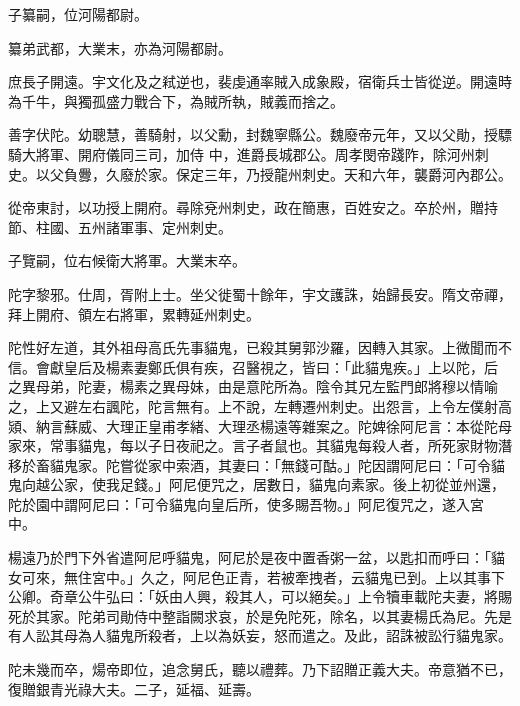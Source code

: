 \begin{pinyinscope}
 子纂嗣，位河陽都尉。



 纂弟武都，大業末，亦為河陽都尉。



 庶長子開遠。宇文化及之弒逆也，裴虔通率賊入成象殿，宿衛兵士皆從逆。開遠時為千牛，與獨孤盛力戰合下，為賊所執，賊義而捨之。



 善字伏陀。幼聰慧，善騎射，以父勳，封魏寧縣公。魏廢帝元年，又以父勛，授驃騎大將軍、開府儀同三司，加侍
 中，進爵長城郡公。周孝閔帝踐阼，除河州刺史。以父負釁，久廢於家。保定三年，乃授龍州刺史。天和六年，襲爵河內郡公。



 從帝東討，以功授上開府。尋除兗州刺史，政在簡惠，百姓安之。卒於州，贈持節、柱國、五州諸軍事、定州刺史。



 子覽嗣，位右候衛大將軍。大業末卒。



 陀字黎邪。仕周，胥附上士。坐父徙蜀十餘年，宇文護誅，始歸長安。隋文帝禪，拜上開府、領左右將軍，累轉延州刺史。



 陀性好左道，其外祖母高氏先事貓鬼，已殺其舅郭沙羅，因轉入其家。上微聞而不信。會獻皇后及楊素妻鄭氏俱有疾，召醫視之，皆曰：「此貓鬼疾。」上以陀，后
 之異母弟，陀妻，楊素之異母妹，由是意陀所為。陰令其兄左監門郎將穆以情喻之，上又避左右諷陀，陀言無有。上不說，左轉遷州刺史。出怨言，上令左僕射高熲、納言蘇威、大理正皇甫孝緒、大理丞楊遠等雜案之。陀婢徐阿尼言：本從陀母家來，常事貓鬼，每以子日夜祀之。言子者鼠也。其貓鬼每殺人者，所死家財物潛移於畜貓鬼家。陀嘗從家中索酒，其妻曰：「無錢可酤。」陀因謂阿尼曰：「可令貓鬼向越公家，使我足錢。」阿尼便咒之，居數日，貓鬼向素家。後上初從並州還，陀於園中謂阿尼曰：「可令貓鬼向皇后所，使多賜吾物。」阿尼復咒之，遂入宮
 中。



 楊遠乃於門下外省遣阿尼呼貓鬼，阿尼於是夜中置香粥一盆，以匙扣而呼曰：「貓女可來，無住宮中。」久之，阿尼色正青，若被牽拽者，云貓鬼已到。上以其事下公卿。奇章公牛弘曰：「妖由人興，殺其人，可以絕矣。」上令犢車載陀夫妻，將賜死於其家。陀弟司勛侍中整詣闕求哀，於是免陀死，除名，以其妻楊氏為尼。先是有人訟其母為人貓鬼所殺者，上以為妖妄，怒而遣之。及此，詔誅被訟行貓鬼家。



 陀未幾而卒，煬帝即位，追念舅氏，聽以禮葬。乃下詔贈正義大夫。帝意猶不已，復贈銀青光祿大夫。二子，延福、延壽。




\end{pinyinscope}

